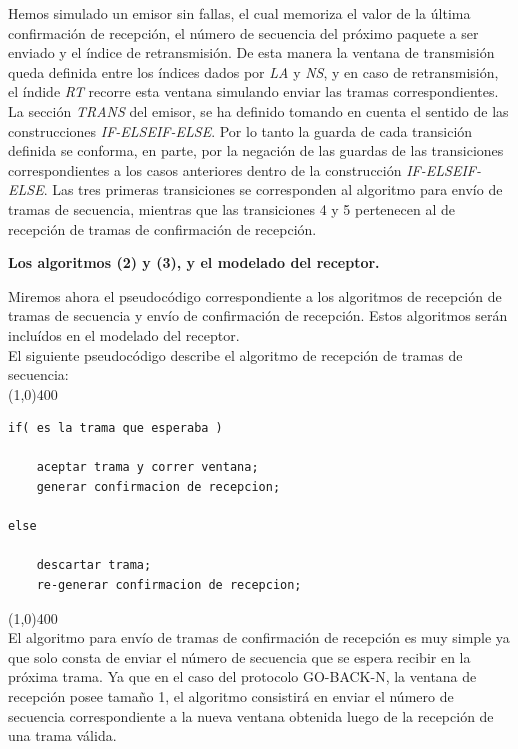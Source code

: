 \documentclass[titlepage, 12pt]{book}
\begin{document}
Hemos simulado un emisor sin fallas, el cual memoriza el valor de la \'ultima confirmaci\'on de recepci\'on, el n\'umero de secuencia del pr\'oximo paquete a ser enviado y el \'indice de retransmisi\'on. De esta manera la ventana de transmisi\'on queda definida entre los \'indices dados por \textit{LA} y \textit{NS}, y en caso de retransmisi\'on, el \'indide \textit{RT} recorre esta ventana simulando enviar las tramas correspondientes.\\

La secci\'on \textit{TRANS} del emisor, se ha definido tomando en cuenta el sentido de las construcciones \textit{IF-ELSEIF-ELSE}. Por lo tanto la guarda de cada transici\'on definida se conforma, en parte, por la negaci\'on de las guardas de las transiciones correspondientes a los casos anteriores dentro de la construcci\'on \textit{IF-ELSEIF-ELSE}. Las tres primeras transiciones se corresponden al algoritmo para env\'io de tramas de secuencia, mientras que las transiciones 4 y 5 pertenecen al de recepci\'on de tramas de confirmaci\'on de recepci\'on.\\


\begin{center}
\textbf{\large Los algoritmos (2) y (3), y el modelado del receptor.}
\end{center}

Miremos ahora el pseudoc\'odigo correspondiente a los algoritmos de recepci\'on de tramas de secuencia y env\'io de confirmaci\'on de recepci\'on. Estos algoritmos ser\'an inclu\'idos en el modelado del receptor.\\

El siguiente pseudoc\'odigo describe el algoritmo de recepci\'on de tramas de secuencia:\\

\noindent \line(1,0){400}\\

\begin{verbatim}
if( es la trama que esperaba )

    aceptar trama y correr ventana;
    generar confirmacion de recepcion;
    
else

    descartar trama;
    re-generar confirmacion de recepcion;
\end{verbatim}

\noindent \line(1,0){400}\\

El algoritmo para env\'io de tramas de confirmaci\'on de recepci\'on es muy simple ya que solo consta de enviar el n\'umero de secuencia que se espera recibir en la pr\'oxima trama. Ya que en el caso del protocolo GO-BACK-N, la ventana de recepci\'on posee tama\~no 1, el algoritmo consistir\'a en enviar el n\'umero de secuencia correspondiente a la nueva ventana obtenida luego de la recepci\'on de una trama v\'alida.\\
\end{document}
